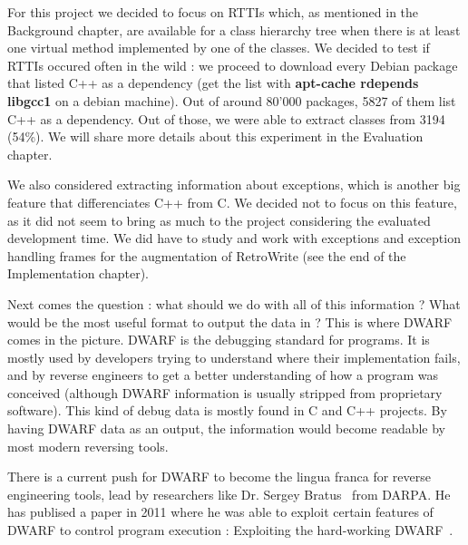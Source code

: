 \documentclass[a4paper,11pt,oneside]{report}
\begin{document}
For this project we decided to focus on RTTIs which, as mentioned in the Background chapter, are available for a class hierarchy tree when there is at least one virtual method implemented by one of the classes.
We decided to test if RTTIs occured often in the wild : we proceed to download every Debian package that listed C++ as a dependency (get the list with \textbf{apt-cache rdepends libgcc1} on a debian machine).
Out of around 80'000 packages, 5827 of them list C++ as a dependency.
Out of those, we were able to extract classes from 3194 (54\%).
We will share more details about this experiment in the Evaluation chapter.

We also considered extracting information about exceptions, which is another big feature that differenciates C++ from C.
We decided not to focus on this feature, as it did not seem to bring as much to the project considering the evaluated development time.
We did have to study and work with exceptions and exception handling frames for the augmentation of RetroWrite (see the end of the Implementation chapter).

Next comes the question : what should we do with all of this information ? What would be the most useful format to output the data in ?
This is where DWARF~\cite{dwarf} comes in the picture. DWARF is the debugging standard for programs.
It is mostly used by developers trying to understand where their implementation fails,
and by reverse engineers to get a better understanding of how a program was conceived (although DWARF information is usually stripped from proprietary software).
This kind of debug data is mostly found in C and C++ projects. %
By having DWARF data as an output, the information would become readable by most modern reversing tools.

There is a current push for DWARF to become the lingua franca for reverse engineering tools, lead by researchers like Dr. Sergey Bratus~\cite{bratus} from DARPA.
He has publised a paper in 2011 where he was able to exploit certain features of DWARF to control program execution : Exploiting the hard-working DWARF~\cite{hardworkingdwarf}.
\end{document}
